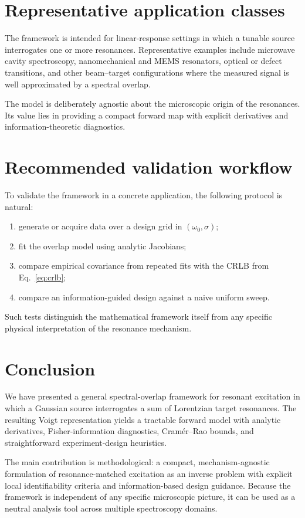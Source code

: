 \documentclass[aps,pre,amsmath,amssymb]{revtex4-2}
\begin{document}
\section{Representative application classes}
The framework is intended for linear-response settings in which a tunable source interrogates one or more resonances. Representative examples include microwave cavity spectroscopy, nanomechanical and MEMS resonators, optical or defect transitions, and other beam--target configurations where the measured signal is well approximated by a spectral overlap.

The model is deliberately agnostic about the microscopic origin of the resonances. Its value lies in providing a compact forward map with explicit derivatives and information-theoretic diagnostics.

\section{Recommended validation workflow}
To validate the framework in a concrete application, the following protocol is natural:
\begin{enumerate}
\item generate or acquire data over a design grid in $(\omega_0,\sigma)$;
\item fit the overlap model using analytic Jacobians;
\item compare empirical covariance from repeated fits with the CRLB from Eq.~\eqref{eq:crlb};
\item compare an information-guided design against a naive uniform sweep.
\end{enumerate}
Such tests distinguish the mathematical framework itself from any specific physical interpretation of the resonance mechanism.

\section{Conclusion}
We have presented a general spectral-overlap framework for resonant excitation in which a Gaussian source interrogates a sum of Lorentzian target resonances. The resulting Voigt representation yields a tractable forward model with analytic derivatives, Fisher-information diagnostics, Cram\'er--Rao bounds, and straightforward experiment-design heuristics.

The main contribution is methodological: a compact, mechanism-agnostic formulation of resonance-matched excitation as an inverse problem with explicit local identifiability criteria and information-based design guidance. Because the framework is independent of any specific microscopic picture, it can be used as a neutral analysis tool across multiple spectroscopy domains.
\end{document}
